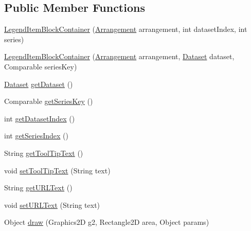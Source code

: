 \subsection*{Public Member Functions}
\begin{DoxyCompactItemize}
\item 
\mbox{\hyperlink{classorg_1_1jfree_1_1chart_1_1title_1_1_legend_item_block_container_a192e29542a7e196d784e6d9505f48094}{Legend\+Item\+Block\+Container}} (\mbox{\hyperlink{interfaceorg_1_1jfree_1_1chart_1_1block_1_1_arrangement}{Arrangement}} arrangement, int dataset\+Index, int series)
\item 
\mbox{\hyperlink{classorg_1_1jfree_1_1chart_1_1title_1_1_legend_item_block_container_ac09b571df1b908d7703e9c924ccaac53}{Legend\+Item\+Block\+Container}} (\mbox{\hyperlink{interfaceorg_1_1jfree_1_1chart_1_1block_1_1_arrangement}{Arrangement}} arrangement, \mbox{\hyperlink{interfaceorg_1_1jfree_1_1data_1_1general_1_1_dataset}{Dataset}} dataset, Comparable series\+Key)
\item 
\mbox{\hyperlink{interfaceorg_1_1jfree_1_1data_1_1general_1_1_dataset}{Dataset}} \mbox{\hyperlink{classorg_1_1jfree_1_1chart_1_1title_1_1_legend_item_block_container_a0e7e9572a3f3e8f77b1c44ab1befc851}{get\+Dataset}} ()
\item 
Comparable \mbox{\hyperlink{classorg_1_1jfree_1_1chart_1_1title_1_1_legend_item_block_container_a9476ba7a42c889b925ebb36dea8acee7}{get\+Series\+Key}} ()
\item 
int \mbox{\hyperlink{classorg_1_1jfree_1_1chart_1_1title_1_1_legend_item_block_container_a14f56b18ce62c0b8edba0011498e1008}{get\+Dataset\+Index}} ()
\item 
int \mbox{\hyperlink{classorg_1_1jfree_1_1chart_1_1title_1_1_legend_item_block_container_a6fc7067d932bd437d673f5a9216291af}{get\+Series\+Index}} ()
\item 
String \mbox{\hyperlink{classorg_1_1jfree_1_1chart_1_1title_1_1_legend_item_block_container_a1d5c73ec0d4312adcaeb64ae07f3d882}{get\+Tool\+Tip\+Text}} ()
\item 
void \mbox{\hyperlink{classorg_1_1jfree_1_1chart_1_1title_1_1_legend_item_block_container_ad1c92f5b5e7c7921aaee209ca078b0e3}{set\+Tool\+Tip\+Text}} (String text)
\item 
String \mbox{\hyperlink{classorg_1_1jfree_1_1chart_1_1title_1_1_legend_item_block_container_a39bc17496fa5139aded45340b3d291af}{get\+U\+R\+L\+Text}} ()
\item 
void \mbox{\hyperlink{classorg_1_1jfree_1_1chart_1_1title_1_1_legend_item_block_container_a0e31f43e709e5fa5409560bd0bc57f59}{set\+U\+R\+L\+Text}} (String text)
\item 
Object \mbox{\hyperlink{classorg_1_1jfree_1_1chart_1_1title_1_1_legend_item_block_container_a402e56d16b82668ea0cd559504021851}{draw}} (Graphics2D g2, Rectangle2D area, Object params)
\end{DoxyCompactItemize}
